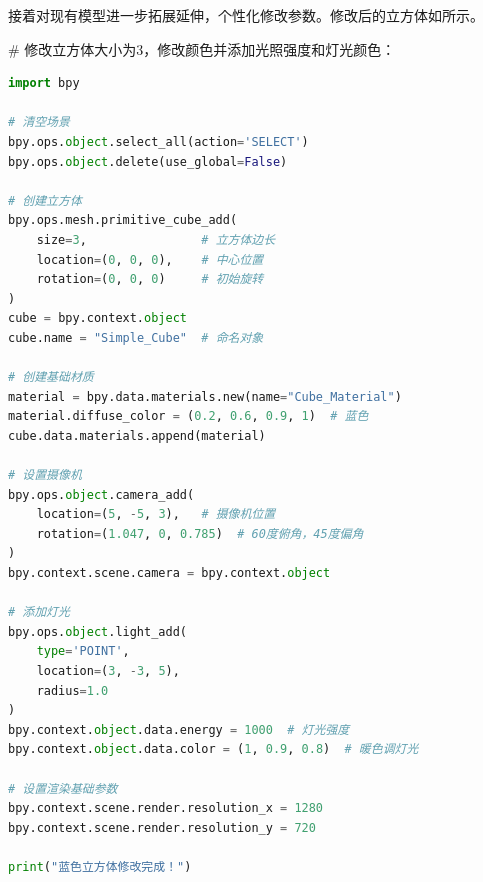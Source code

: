 
接着对现有模型进一步拓展延伸，个性化修改参数。修改后的立方体如所示。


\begin{gptbox} 
\footnotesize{\# 修改立方体大小为3，修改颜色并添加光照强度和灯光颜色：}
\small{
\begin{lstlisting}[language=Python]
import bpy

# 清空场景
bpy.ops.object.select_all(action='SELECT')
bpy.ops.object.delete(use_global=False)

# 创建立方体
bpy.ops.mesh.primitive_cube_add(
    size=3,                # 立方体边长
    location=(0, 0, 0),    # 中心位置
    rotation=(0, 0, 0)     # 初始旋转
)
cube = bpy.context.object
cube.name = "Simple_Cube"  # 命名对象

# 创建基础材质
material = bpy.data.materials.new(name="Cube_Material")
material.diffuse_color = (0.2, 0.6, 0.9, 1)  # 蓝色
cube.data.materials.append(material)

# 设置摄像机
bpy.ops.object.camera_add(
    location=(5, -5, 3),   # 摄像机位置
    rotation=(1.047, 0, 0.785)  # 60度俯角，45度偏角
)
bpy.context.scene.camera = bpy.context.object

# 添加灯光
bpy.ops.object.light_add(
    type='POINT',
    location=(3, -3, 5),
    radius=1.0
)
bpy.context.object.data.energy = 1000  # 灯光强度
bpy.context.object.data.color = (1, 0.9, 0.8)  # 暖色调灯光

# 设置渲染基础参数
bpy.context.scene.render.resolution_x = 1280
bpy.context.scene.render.resolution_y = 720

print("蓝色立方体修改完成！")

\end{lstlisting}
} 
\end{gptbox} 

